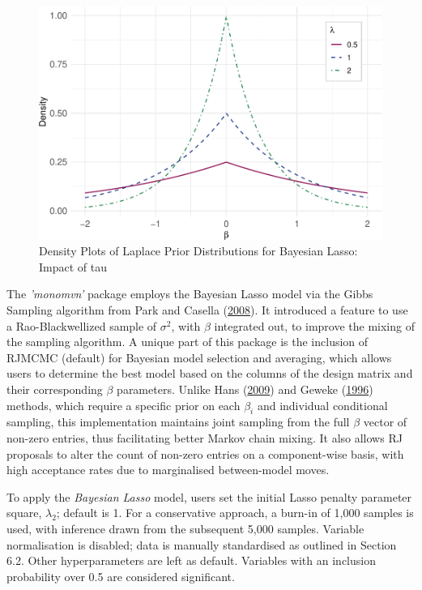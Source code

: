 \documentclass[
  11pt,
]{article}
\begin{document}
\begin{figure}[H]

{\centering \includegraphics[width=0.75\linewidth]{dissertation_files/figure-latex/Bayesian Lasso Priors-1} 

}

\caption{Density Plots of Laplace Prior Distributions for Bayesian Lasso: Impact of tau}\label{fig:Bayesian Lasso Priors}
\end{figure}

The \emph{'monomvn'} package employs the Bayesian Lasso model via the
Gibbs Sampling algorithm from Park and Casella
(\protect\hyperlink{ref-Casella2008}{2008}). It introduced a feature to
use a Rao-Blackwellized sample of \(\sigma^2\), with \(\beta\)
integrated out, to improve the mixing of the sampling algorithm. A
unique part of this package is the inclusion of RJMCMC (default) for
Bayesian model selection and averaging, which allows users to determine
the best model based on the columns of the design matrix and their
corresponding \(\beta\) parameters. Unlike Hans
(\protect\hyperlink{ref-Hans2009}{2009}) and Geweke
(\protect\hyperlink{ref-Geweke1996}{1996}) methods, which require a
specific prior on each \(\beta_i\) and individual conditional sampling,
this implementation maintains joint sampling from the full \(\beta\)
vector of non-zero entries, thus facilitating better Markov chain
mixing. It also allows RJ proposals to alter the count of non-zero
entries on a component-wise basis, with high acceptance rates due to
marginalised between-model moves.

To apply the \emph{Bayesian Lasso} model, users set the initial Lasso
penalty parameter square, \(\lambda_{2}\); default is 1. For a
conservative approach, a burn-in of 1,000 samples is used, with
inference drawn from the subsequent 5,000 samples. Variable
normalisation is disabled; data is manually standardised as outlined in
Section 6.2. Other hyperparameters are left as default. Variables with
an inclusion probability over 0.5 are considered significant.
\end{document}
